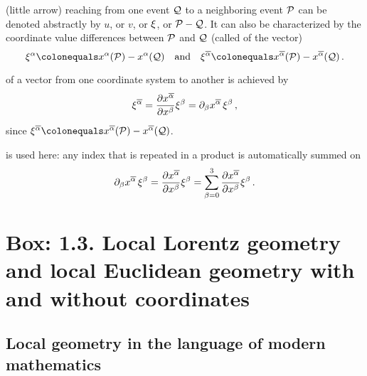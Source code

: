 (little arrow) reaching from one event $\event Q$ to a neighboring event $\event P$ can be denoted abstractly by 
$u$, or $v$, or $\xi$, or $\event P - \event Q$. It can also be characterized by the coordinate value differences between $\event P$ and $\event Q$ (called  of the vector)
%
\begin{equation*}
  \tvec\svec\alpha \defas \tvec\pos\alpha\vat{\event P} - \tvec\pos\alpha\vat{\event Q}     \quad\text{and}\quad
  \atvec\svec\alpha \defas \atvec\pos\alpha\vat{\event P} - \atvec\pos\alpha\vat{\event Q}  \,.
\end{equation*}

 of a vector from one coordinate system to another is achieved by 
%
\begin{equation*}
  \atvec\svec\alpha = \dfrac{\partial\atvec\pos\alpha}{\partial\tvec\pos\beta}\tvec\svec\beta
                    = \ipd\beta\atvec\pos\alpha\,\tvec\svec\beta \,,
\end{equation*}
%
since $\atvec\svec\alpha \defas \atvec\pos\alpha\vat{\event P} - \atvec\pos\alpha\vat{\event Q}$.

 is used here: any index that is repeated in a product is automatically summed on
%
\begin{equation*}
  \ipd\beta\atvec\pos\alpha\,\tvec\svec\beta = \dfrac{\partial\atvec\pos\alpha}{\partial\tvec\pos\beta}\tvec\svec\beta
                                             = \sum_{\beta = 0}^{3}\dfrac{\partial\atvec\pos\alpha}{\partial\tvec\pos\beta}\tvec\svec\beta\,.
\end{equation*}


\section{Box: 1.3. Local Lorentz geometry and local Euclidean geometry with and without coordinates}
%
\subsection{Local geometry in the language of modern mathematics}
%
